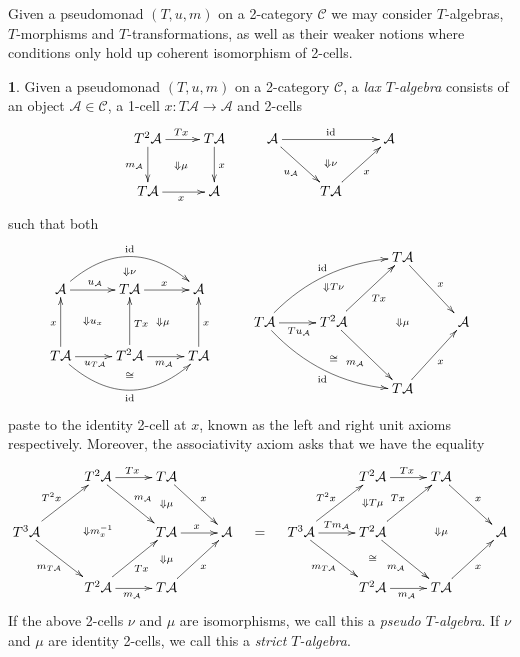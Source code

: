 \documentclass[a4paper,oneside,english]{amsart}
\numberwithin{equation}{section}
\numberwithin{figure}{section}
\theoremstyle{plain}
\theoremstyle{definition}
\newtheorem{defn}[thm]{\protect\definitionname}
\theoremstyle{remark}
\theoremstyle{definition}
\theoremstyle{plain}
\theoremstyle{plain}
\theoremstyle{plain}
\providecommand{\definitionname}{Definition}
\begin{document}
Given a pseudomonad $\left(T,u,m\right)$ on a 2-category $\mathscr{C}$
we may consider $T$-algebras, $T$-morphisms and $T$-transformations,
as well as their weaker notions where conditions only hold up coherent
isomorphism of 2-cells.
\begin{defn}
Given a pseudomonad $\left(T,u,m\right)$ on a 2-category $\mathscr{C}$,
a \emph{lax $T$-algebra} consists of an object $\mathcal{A}\in\mathscr{C}$,
a 1-cell $x:T\mathcal{A}\to\mathcal{A}$ and 2-cells
\[
\xymatrix{T^{2}\mathcal{A}\ar[d]_{m_{\mathcal{A}}}\ar[r]^{Tx}\ar@{}[rd]|-{\Downarrow\mu} & T\mathcal{A}\ar[d]^{x} & \mathcal{A}\ar[rr]^{\textnormal{id}}\ar[rd]_{u_{\mathcal{A}}} & \;\ar@{}[d]|-{\Downarrow\nu} & \mathcal{A}\\
T\mathcal{A}\ar[r]_{x} & \mathcal{A} &  & T\mathcal{A}\ar[ur]_{x}
}
\]
such that both 
\[
\xymatrix@=1em{ &  & \ar@{}[d]|-{\Downarrow\nu} &  &  &  &  &  & \ar@{}[dd]|-{\Downarrow T\nu} &  & T\mathcal{A}\ar[rrdd]^{x}\ar@{}[dddd]|-{\Downarrow\mu}\\
\mathcal{A}\ar[rr]^{u_{\mathcal{A}}}\ar@/^{2pc}/[rrrr]^{\textnormal{id}}\ar@{}[drdr]|-{\Downarrow u_{x}} &  & T\mathcal{A}\ar[rr]^{x}\ar@{}[ddrr]|-{\Downarrow\mu} &  & \mathcal{A}\\
 &  &  &  &  &  & T\mathcal{A}\ar@/^{1pc}/[rrrruu]^{\textnormal{id}}\ar[rr]_{Tu_{\mathcal{A}}}\ar@/_{1pc}/[rrrrdd]_{\textnormal{id}} &  & T^{2}\mathcal{A}\ar[uurr]_{Tx}\ar[ddrr]_{m_{\mathcal{A}}}\ar@{}[dd]|-{\cong} &  &  &  & \mathcal{A}\\
T\mathcal{A}\ar[rr]_{u_{T\mathcal{A}}}\ar@/_{2pc}/[rrrr]_{\textnormal{id}}\ar[uu]^{x} &  & T^{2}\mathcal{A}\ar[uu]_{Tx}\ar[rr]_{m_{\mathcal{A}}} &  & T\mathcal{A}\ar[uu]_{x}\\
 &  & \ar@{}[u]|-{\cong} &  &  &  &  &  & \; &  & T\mathcal{A}\ar[urur]_{x}
}
\]
paste to the identity 2-cell at $x$, known as the left and right
unit axioms respectively. Moreover, the associativity axiom asks that
we have the equality 
\[
\xymatrix@=1em{ &  & T^{2}\mathcal{A}\ar[rr]^{Tx}\ar[rdrd]^{m_{\mathcal{A}}}\ar@{}[dddd]|-{\Downarrow m_{x}^{-1}} &  & T\mathcal{A}\ar[rrdd]^{x}\ar@{}[dd]|-{\Downarrow\mu} &  &  &  &  &  & T^{2}\mathcal{A}\ar[rr]^{Tx}\ar@{}[dd]|-{\Downarrow T\mu} &  & T\mathcal{A}\ar[rrdd]^{x}\ar@{}[dddd]|-{\Downarrow\mu}\\
\\
T^{3}\mathcal{A}\ar[urur]^{T^{2}x}\ar[rrdd]_{m_{T\mathcal{A}}} &  &  &  & T\mathcal{A}\ar[rr]^{x}\ar@{}[dd]|-{\Downarrow\mu} &  & \mathcal{A} & = & T^{3}\mathcal{A}\ar[rr]^{Tm_{\mathcal{A}}}\ar[uurr]^{T^{2}x}\ar[rdrd]_{m_{T\mathcal{A}}} &  & T^{2}\mathcal{A}\ar[uurr]^{Tx}\ar[ddrr]_{m_{\mathcal{A}}}\ar@{}[dd]|-{\cong} &  &  &  & \mathcal{A}\\
\\
 &  & T^{2}\mathcal{A}\ar[rr]_{m_{\mathcal{A}}}\ar[uurr]_{Tx} &  & T\mathcal{A}\ar[rruu]_{x} &  &  &  &  &  & T^{2}\mathcal{A}\ar[rr]_{m_{\mathcal{A}}} &  & T\mathcal{A}\ar[rruu]_{x}
}
\]
If the above 2-cells $\nu$ and $\mu$ are isomorphisms, we call this
a \emph{pseudo $T$-algebra}. If $\nu$ and $\mu$ are identity 2-cells,
we call this a \emph{strict $T$-algebra}.
\end{defn}
\end{document}
